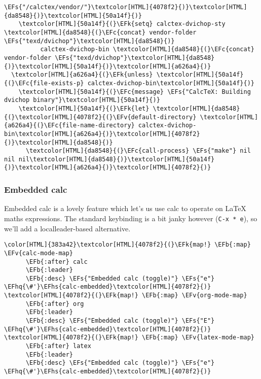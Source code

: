\documentclass{scrartcl}
\newcommand{\EFk}[1]{\textcolor{EFk}{#1}} %
\newcommand{\EFs}[1]{\textcolor{EFs}{#1}} %
\newcommand{\EFb}[1]{\textcolor{EFb}{#1}} %
\newcommand{\EFc}[1]{\textcolor{EFc}{#1}} %
\newcommand{\EFv}[1]{\textcolor{EFv}{#1}} %
\newcommand{\EFhq}[1]{\textcolor{EFhq}{#1}} %
\newcommand{\EFhs}[1]{\textcolor{EFhs}{#1}} %
\begin{document}
\begin{Code}
\begin{Verbatim}[]
                               \EFs{"/calctex/vendor/"}\textcolor[HTML]{4078f2}{)}\textcolor[HTML]{da8548}{)}\textcolor[HTML]{50a14f}{)}
    \textcolor[HTML]{50a14f}{(}\EFk{setq} calctex-dvichop-sty \textcolor[HTML]{da8548}{(}\EFc{concat} vendor-folder \EFs{"texd/dvichop"}\textcolor[HTML]{da8548}{)}
          calctex-dvichop-bin \textcolor[HTML]{da8548}{(}\EFc{concat} vendor-folder \EFs{"texd/dvichop"}\textcolor[HTML]{da8548}{)}\textcolor[HTML]{50a14f}{)}\textcolor[HTML]{a626a4}{)}
  \textcolor[HTML]{a626a4}{(}\EFk{unless} \textcolor[HTML]{50a14f}{(}\EFc{file-exists-p} calctex-dvichop-bin\textcolor[HTML]{50a14f}{)}
    \textcolor[HTML]{50a14f}{(}\EFc{message} \EFs{"CalcTeX: Building dvichop binary"}\textcolor[HTML]{50a14f}{)}
    \textcolor[HTML]{50a14f}{(}\EFk{let} \textcolor[HTML]{da8548}{(}\textcolor[HTML]{4078f2}{(}\EFv{default-directory} \textcolor[HTML]{a626a4}{(}\EFc{file-name-directory} calctex-dvichop-bin\textcolor[HTML]{a626a4}{)}\textcolor[HTML]{4078f2}{)}\textcolor[HTML]{da8548}{)}
      \textcolor[HTML]{da8548}{(}\EFc{call-process} \EFs{"make"} nil nil nil\textcolor[HTML]{da8548}{)}\textcolor[HTML]{50a14f}{)}\textcolor[HTML]{a626a4}{)}\textcolor[HTML]{4078f2}{)}
\end{Verbatim}
\end{Code}

\subsubsection{Embedded calc}
\label{sec:org4346c55}

Embedded calc is a lovely feature which let's us use calc to operate on \LaTeX{}
maths expressions. The standard keybinding is a bit janky however (\texttt{C-x * e}), so
we'll add a localleader-based alternative.

\begin{Code}
\begin{Verbatim}[]
\color[HTML]{383a42}\textcolor[HTML]{4078f2}{(}\EFk{map!} \EFb{:map} \EFv{calc-mode-map}
      \EFb{:after} calc
      \EFb{:leader}
      \EFb{:desc} \EFs{"Embedded calc (toggle)"} \EFs{"e"} \EFhq{\#'}\EFhs{calc-embedded}\textcolor[HTML]{4078f2}{)}
\textcolor[HTML]{4078f2}{(}\EFk{map!} \EFb{:map} \EFv{org-mode-map}
      \EFb{:after} org
      \EFb{:leader}
      \EFb{:desc} \EFs{"Embedded calc (toggle)"} \EFs{"E"} \EFhq{\#'}\EFhs{calc-embedded}\textcolor[HTML]{4078f2}{)}
\textcolor[HTML]{4078f2}{(}\EFk{map!} \EFb{:map} \EFv{latex-mode-map}
      \EFb{:after} latex
      \EFb{:leader}
      \EFb{:desc} \EFs{"Embedded calc (toggle)"} \EFs{"e"} \EFhq{\#'}\EFhs{calc-embedded}\textcolor[HTML]{4078f2}{)}
\end{Verbatim}
\end{Code}
\end{document}
